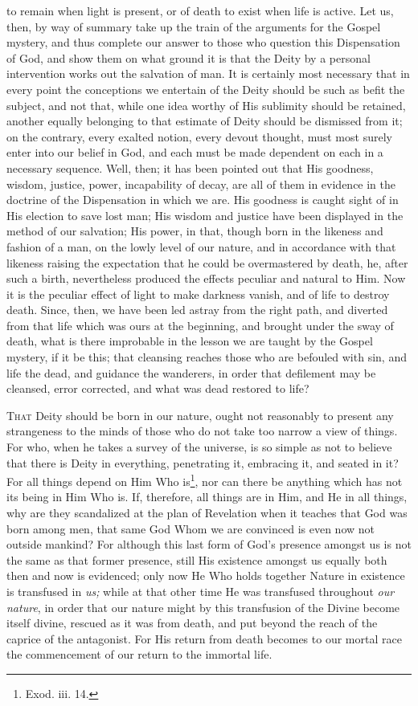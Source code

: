 to remain when light is present, or of death to exist when life is active. Let us, then, by way of summary take up the train of the arguments for the Gospel mystery, and thus complete our answer to those who question this Dispensation of God, and show them on what ground it is that the Deity by a personal intervention works out the salvation of man. It is certainly most necessary that in every point the conceptions we entertain of the Deity should be such as befit the subject, and not that, while one idea worthy of His sublimity should be retained, another equally belonging to that estimate of Deity should be dismissed from it; on the contrary, every exalted notion, every devout thought, must most surely enter into our belief in God, and each must be made dependent on each in a necessary sequence. Well, then; it has been pointed out that His goodness, wisdom, justice, power, incapability of decay, are all of them in evidence in the doctrine of the Dispensation in which we are. His goodness is caught sight of in His election to save lost man; His wisdom and justice have been displayed in the method of our salvation; His power, in that, though born in the likeness and fashion of a man, on the lowly level of our nature, and in accordance with that likeness raising the expectation that he could be overmastered by death, he, after such a birth, nevertheless produced the effects peculiar and natural to Him. Now it is the peculiar effect of light to make darkness vanish, and of life to destroy death. Since, then, we have been led astray from the right path, and diverted from that life which was ours at the beginning, and brought under the sway of death, what is there improbable in the lesson we are taught by the Gospel mystery, if it be this; that cleansing reaches those who are befouled with sin, and life the dead, and guidance the wanderers, in order that defilement may be cleansed, error corrected, and what was dead restored to life?


\textsc{That} Deity should be born in our nature, ought not reasonably to present any strangeness to the minds of those who do not take too narrow a view of things. For who, when he takes a survey of the universe, is so simple as not to believe that there is Deity in everything, penetrating it, embracing it, and seated in it? For all things depend on Him Who is\footnote{Exod. iii. 14.}, nor can there be anything which has not its being in Him Who is. If, therefore, all things are in Him, and He in all things, why are they scandalized at the plan of Revelation when it teaches that God was born among men, that same God Whom we are convinced is even now not outside mankind? For although this last form of God’s presence amongst us is not the same as that former presence, still His existence amongst us equally both then and now is evidenced; only now He Who holds together Nature in existence is transfused in \emph{us;} while at that other time He was transfused throughout \emph{our nature}, in order that our nature might by this transfusion of the Divine become itself divine, rescued as it was from death, and put beyond the reach of the caprice of the antagonist. For His return from death becomes to our mortal race the commencement of our return to the immortal life.

